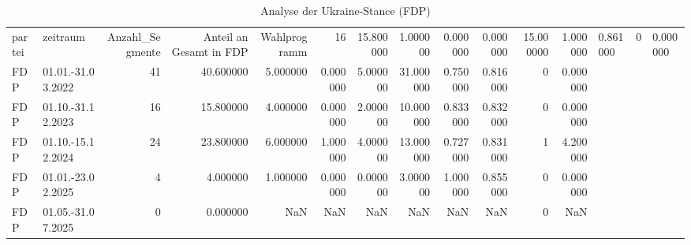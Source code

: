 \begin{table}
\caption{Analyse der Ukraine-Stance (FDP)}
\label{tab:meine_tabelle}
\begin{tabular}{llrrrrrrrrrr}
\toprule
partei & zeitraum & Anzahl_Segmente & Anteil an Gesamt in %
\midrule
FDP & Wahlprogramm & 16 & 15.800000 & 1.000000 & 0.000000 & 0.000000 & 15.000000 & 1.000000 & 0.861000 & 0 & 0.000000 \\
FDP & 01.01.-31.03.2022 & 41 & 40.600000 & 5.000000 & 0.000000 & 5.000000 & 31.000000 & 0.750000 & 0.816000 & 0 & 0.000000 \\
FDP & 01.10.-31.12.2023 & 16 & 15.800000 & 4.000000 & 0.000000 & 2.000000 & 10.000000 & 0.833000 & 0.832000 & 0 & 0.000000 \\
FDP & 01.10.-15.12.2024 & 24 & 23.800000 & 6.000000 & 1.000000 & 4.000000 & 13.000000 & 0.727000 & 0.831000 & 1 & 4.200000 \\
FDP & 01.01.-23.02.2025 & 4 & 4.000000 & 1.000000 & 0.000000 & 0.000000 & 3.000000 & 1.000000 & 0.855000 & 0 & 0.000000 \\
FDP & 01.05.-31.07.2025 & 0 & 0.000000 & NaN & NaN & NaN & NaN & NaN & NaN & 0 & NaN \\
\bottomrule
\end{tabular}
\end{table}
